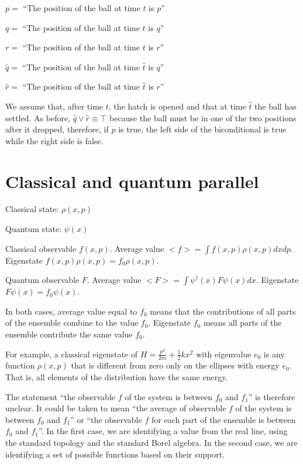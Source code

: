 \documentclass[10pt,twocolumn, nofootinbib]{revtex4-1}
\begin{document}
\begin{description}
    \item $p =$ ``The position of the ball at time $t$ is $p$''
    \item $q =$ ``The position of the ball at time $t$ is $q$''
    \item $r =$ ``The position of the ball at time $t$ is $r$''
    \item $\hat{q} =$ ``The position of the ball at time $\hat{t}$ is $q$''
    \item $\hat{r} =$ ``The position of the ball at time $\hat{t}$ is $r$''
\end{description}

We assume that, after time $t$, the hatch is opened and that at time $\hat{t}$ the ball has settled. As before, $\hat{q} \vee \hat{r} \equiv \top$ because the ball must be in one of the two positions after it dropped, therefore, if $p$ is true, the left side of the biconditional is true while the right side is false.

\section{Classical and quantum parallel}

Classical state: $\rho(x,p)$

Quantum state: $\psi(x)$

Classical observable $f(x,p)$. Average value $<f> = \int f(x, p) \rho(x, p) dx dp$. Eigenstate $f(x, p) \rho(x, p) = f_0 \rho(x, p)$.

Quantum observable $F$. Average value $<F> = \int \psi^\dagger(x) F \psi(x) dx$. Eigenstate $F \psi(x) = f_0 \psi(x)$.

In both cases, average value equal to $f_0$ means that the contributions of all parts of the ensemble combine to the value $f_0$. Eigenstate $f_0$ means all parts of the ensemble contribute the same value $f_0$.

For example, a classical eigenstate of $H = \frac{p^2}{2m} + \frac{1}{2} k x^2$ with eigenvalue $e_0$ is any function $\rho(x,p)$ that is different from zero only on the ellipses with energy $e_0$. That is, all elements of the distribution have the same energy.

The statement ``the observable $f$ of the system is between $f_0$ and $f_1$'' is therefore unclear. It could be taken to mean ``the average of observable $f$ of the system is between $f_0$ and $f_1$'' or ``the observable $f$ for each part of the ensemble is between $f_0$ and $f_1$''. In the first case, we are identifying a value from the real line, using the standard topology and the standard Borel algebra. In the second case, we are identifying a set of possible functions based on their support.
\end{document}
